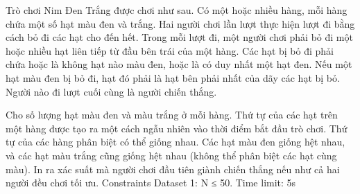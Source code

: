 Trò chơi Nim Đen Trắng được chơi như sau. Có một hoặc nhiều hàng, mỗi hàng chứa một số hạt màu đen và trắng. Hai người chơi lần lượt thực hiện lượt đi bằng cách bỏ đi các hạt cho đến hết. Trong mỗi lượt đi, một người chơi phải bỏ đi một hoặc nhiều hạt liên tiếp từ đầu bên trái của một hàng. Các hạt bị bỏ đi phải chứa hoặc là không hạt nào màu đen, hoặc là có duy nhất một hạt đen. Nếu một hạt màu đen bị bỏ đi, hạt đó phải là hạt bên phải nhất của dãy các hạt bị bỏ. Người nào đi lượt cuối cùng là người chiến thắng.  

   Cho số lượng hạt màu đen và màu trắng ở mỗi hàng. Thứ tự của các hạt trên một hàng được tạo ra một cách ngẫu nhiên vào thời điểm bắt đầu trò chơi. Thứ tự của các hàng phân biệt có thể giống nhau. Các hạt màu đen giống hệt nhau, và các hạt màu trắng cũng giống hệt nhau (không thể phân biệt các hạt cùng màu). In ra xác suất mà người chơi đầu tiên giành chiến thắng nếu như cả hai người đều chơi tối ưu.
   Constraints  
Dataset 1: N ≤ 50. Time limit: 5s